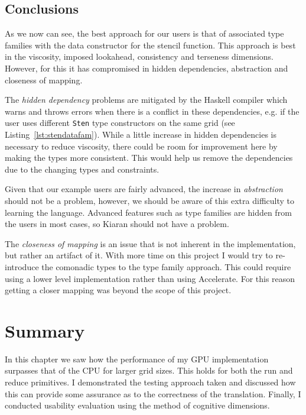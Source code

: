 \documentclass[12pt,a4paper,twoside]{scrbook}
\begin{document}
\subsection{Conclusions}


As we now can see, the best approach for our users is that of associated type
families with the data constructor for the stencil function. This approach is
best in the viscosity, imposed lookahead, consistency and terseness
dimensions. However, for this it has compromised in hidden dependencies,
abstraction and closeness of mapping.

The \emph{hidden dependency} problems are mitigated by the Haskell compiler
which warns and throws errors when there is a conflict in these dependencies,
e.g. if the user uses different \texttt{Sten} type constructors on the same grid
(see Listing~\ref{lst:stendatafam}). While a little increase in hidden
dependencies is necessary to reduce viscosity, there could be room for
improvement here by making the types more consistent. This would help us remove
the dependencies due to the changing types and constraints.

Given that our example users are fairly advanced, the increase in
\emph{abstraction} should not be a problem, however, we should be aware of this
extra difficulty to learning the language. Advanced features such as type
families are hidden from the users in most cases, so Kiaran should not have a
problem.

The \emph{closeness of mapping} is an issue that is not inherent in the
implementation, but rather an artifact of it. With more time on this
project I would try to re-introduce the comonadic types to the type
family approach. This could require using a lower level implementation
rather than using Accelerate. For this reason getting a closer mapping
was beyond the scope of this project.

\section{Summary}

In this chapter we saw how the performance of my GPU implementation surpasses
that of the CPU for larger grid sizes. This holds for both the run and reduce
primitives. I demonstrated the testing approach taken and discussed how this can
provide some assurance as to the correctness of the translation. Finally, I
conducted usability evaluation using the method of cognitive dimensions.
\end{document}
